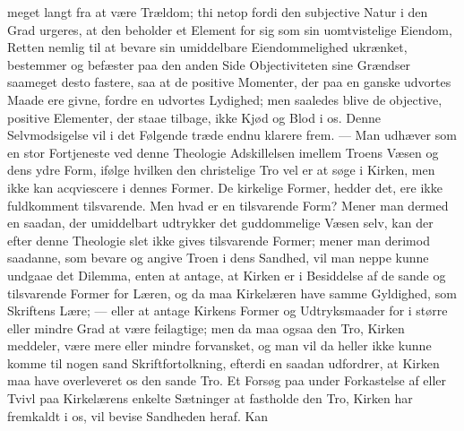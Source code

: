 \documentclass[12pt]{book}
\newcommand{\opage}[1]{\marginnote{\footnotesize\textit{[#1]}}}
\begin{document}
meget langt fra at være Trældom; thi netop fordi den subjective Natur i den
Grad urgeres, at den beholder et Element for sig som sin uomtvistelige
Eiendom, Retten nemlig til at bevare sin umiddelbare Eiendommelighed
ukrænket, bestemmer og befæster paa den anden Side Objectiviteten sine
Grændser saameget desto fastere, saa at de positive Momenter, der paa en
ganske udvortes Maade ere givne, fordre en udvortes Lydighed; men saaledes
blive de objective, positive Elementer, der staae tilbage, ikke Kjød og Blod i
os. Denne Selvmodsigelse vil i det Følgende træde endnu klarere frem. --- Man
udhæver som en stor Fortjeneste ved denne Theologie Adskillelsen imellem
Troens Væsen og dens ydre Form, ifølge hvilken den christelige Tro vel er at
søge i Kirken, men ikke kan acqviescere i dennes Former. De kirkelige Former,
hedder det, ere ikke fuldkomment tilsvarende. Men hvad er en tilsvarende Form?
Mener man dermed en saadan, der umiddelbart udtrykker det guddommelige Væsen
selv, kan der efter denne Theologie slet ikke gives tilsvarende Former; mener
man derimod saadanne, som bevare og angive Troen i dens Sandhed, vil man neppe
kunne undgaae det Dilemma, enten at antage, at Kirken er i Besiddelse af de
sande og tilsvarende Former for Læren, og da maa Kirkelæren have samme
\opage{107} Gyldighed, som Skriftens Lære; --- eller at antage Kirkens Former og
Udtryksmaader for i større eller mindre Grad at være feilagtige; men da maa
ogsaa den Tro, Kirken meddeler, være mere eller mindre forvansket, og man vil
da heller ikke kunne komme til nogen sand Skriftfortolkning, efterdi en saadan
udfordrer, at Kirken maa have overleveret os den sande Tro. Et Forsøg paa
under Forkastelse af eller Tvivl paa Kirkelærens enkelte Sætninger at
fastholde den Tro, Kirken har fremkaldt i os, vil bevise Sandheden heraf. Kan
\end{document}
